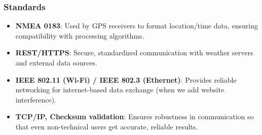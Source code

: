 \subsubsection{Standards}
\begin{itemize}
    \item \textbf{NMEA 0183}: Used by GPS receivers to format location/time data, ensuring compatibility with processing algorithms.
    \item \textbf{REST/HTTPS}: Secure, standardized communication with weather servers and external data sources.
    \item \textbf{IEEE 802.11 (Wi-Fi) / IEEE 802.3 (Ethernet)}: Provides reliable networking for internet-based data exchange (when we add website interference).
    \item \textbf{TCP/IP, Checksum validation}: Ensures robustness in communication so that even non-technical users get accurate, reliable results.
\end{itemize}